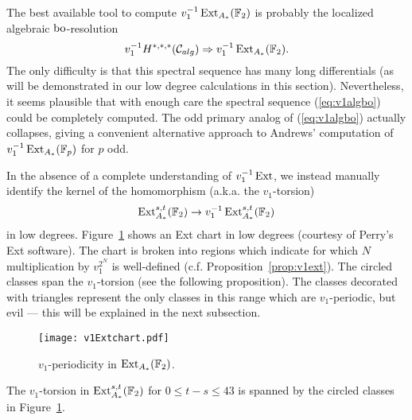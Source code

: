 \begin{rmk}
The best available tool to compute $v_1^{-1}\operatorname{Ext}_{A_*}(\mathbb{F}_2)$ is probably the localized algebraic $\mathrm{bo}$-resolution
\begin{equation}\label{eq:v1algbo}
 v_1^{-1}H^{*,*,*}(\mathcal{C}_{alg}) \Rightarrow v_1^{-1}\operatorname{Ext}_{A_*}(\mathbb{F}_2).
 \end{equation}
The only difficulty is that this spectral sequence has many long differentials (as will be demonstrated in our low degree calculations in this section).  Nevertheless, it seems plausible that with enough care the spectral sequence (\ref{eq:v1algbo}) could be completely computed.  The odd primary analog of (\ref{eq:v1algbo}) actually collapses, giving a convenient alternative approach to Andrews' computation of $v_1^{-1}\operatorname{Ext}_{A_*}(\mathbb{F}_p)$ for $p$ odd.
\end{rmk}

In the absence of a complete understanding of $v_1^{-1}\operatorname{Ext}$, we instead manually identify the kernel of the homomorphism
(a.k.a. the $v_1$-torsion)
$$ \operatorname{Ext}^{s,t}_{A_*}(\mathbb{F}_2) \rightarrow v_1^{-1}\operatorname{Ext}^{s,t}_{A_*}(\mathbb{F}_2) $$
in low degrees.  Figure~\ref{fig:v1Extchart} shows an Ext chart in low degrees (courtesy of Perry's Ext software).  The chart is broken into regions which indicate for which $N$ multiplication by $v_1^{2^N}$ is well-defined (c.f. Proposition~\ref{prop:v1ext}).  The circled classes span the $v_1$-torsion (see the following proposition).  The classes decorated with triangles represent the only classes in this range which are $v_1$-periodic, but evil --- this will be explained in the next subsection.


\begin{figure}
\texttt{[image: v1Extchart.pdf]}
\caption{$v_1$-periodicity in $\operatorname{Ext}_{A_*}(\mathbb{F}_2)$.}\label{fig:v1Extchart}
\end{figure}

\begin{prop}\label{prop:v1Extchart}
The $v_1$-torsion in $\operatorname{Ext}^{s,t}_{A_*}(\mathbb{F}_2)$ for $0\leq t-s\leq 43$ is spanned by the circled classes in Figure~\ref{fig:v1Extchart}.
\end{prop}

